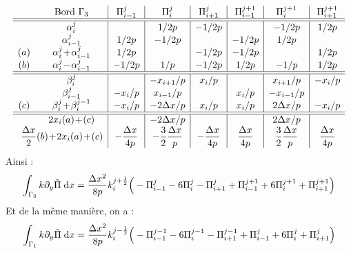 \documentclass[main.tex]{subfiles}
\begin{document}
$$\medmuskip=1mu
\begin{array}{cc|c|c|c|c|c|c}
&\textrm{Bord } \Gamma_3  & \Pi_{i-1}^j & \Pi_i^j & \Pi_{i+1}^j & \Pi_{i-1}^{j+1} & \Pi_i^{j+1} & \Pi_{i+1}^{j+1} \\
\hline \hline
 & \alpha_i^j & & 1 /2p & -1 /2p && -1 /2p & 1 /2p \\
 & \alpha_{i-1}^j & 1/2p & -1/2p && -1 /2p & 1/2p & \\
(a) &  \alpha_i^j + \alpha_{i-1}^j & 1 /2p && -1 /2p &-1 /2p && 1 /2p \\
(b) &  \alpha_i^j - \alpha_{i-1}^j & -1/2p & 1/p &-1/2p &1/2p &-1/p & 1 /2p \\
\hline \hline
 &  \beta_i^j && - x_{i+1}/p & x_{i}/p && x_{i+1}/p & - x_{i}/p \\
 &  \beta_{i-1}^j & - x_{i}/p & x_{i-1}/p && x_{i}/p & - x_{i-1}/p & \\
(c) & \beta_i^j + \beta_i^{j-1} & -x_{i}/p &-2\Delta x/p & x_{i}/p &  x_{i}/p & 2\Delta x/p &  - x_{i}/p \\
\hline \hline
 &  2x_i(a) +(c)  & &  -2\Delta x/p & && 2 \Delta x/p & \\
 & \hspace{-7mm} \dfrac{\Delta x}{2} (b) +2x_i(a) +(c)  & -\dfrac{\Delta x}{4p} & -\dfrac{3}{2} \dfrac{\Delta x}{p}  & -\dfrac{\Delta x}{4p}  &  \dfrac{\Delta x}{4p} & \dfrac{3}{2} \dfrac{\Delta x}{p} & \dfrac{ \Delta x}{4p} \\
\end{array}
$$
Ainsi :
\begin{equation}
\int_{\Gamma_3} k \partial_y \tilde{\Pi} \;{\rm d}x = \frac{\Delta x^2}{8p} k_i^{j+\frac{1}{2}} \Big( -\Pi_{i-1}^j -6 \Pi_i^j - \Pi_{i+1}^j + \Pi_{i-1}^{j+1} +6 \Pi_i^{j+1} + \Pi_{i+1}^{j+1}  \Big)
\end{equation}
Et de la même manière, on a :
\begin{equation}
\int_{\Gamma_1} k \partial_y \tilde{\Pi} \;{\rm d}x = \frac{\Delta x^2}{8p} k_i^{j-\frac{1}{2}} \Big( -\Pi_{i-1}^{j-1} -6 \Pi_i^{j-1} - \Pi_{i+1}^{j-1} + \Pi_{i-1}^j +6 \Pi_i^j + \Pi_{i+1}^j  \Big) \\
\end{equation}
\end{document}
